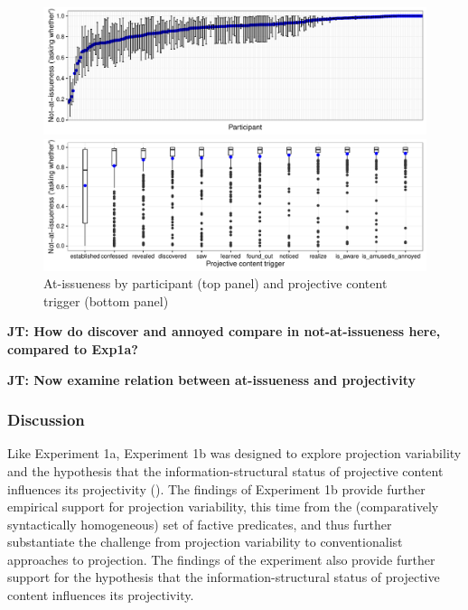 \documentclass[11pt,fleqn]{article}
\newcommand{\6}{\mbox{$[\hspace*{-.6mm}[$}}
\newcommand{\9}{\mbox{$]\hspace*{-.6mm}]$}}
\newcommand{\jt}[1]{\textbf{\color{blue}JT: #1}}
\begin{document}
\begin{figure}[!h]
\begin{center}

\includegraphics[width=16cm]{../results/exp1b/graphs/ai-subjectmeans}

\includegraphics[width=16cm]{../results/exp1b/graphs/boxplot-not-at-issueness}

\end{center}
\caption{At-issueness by participant (top panel) and projective content trigger (bottom panel)}
\label{f-ai-1b}
\end{figure}

\jt{How do discover and annoyed compare in not-at-issueness here, compared to Exp1a?}

\jt{Now examine relation between at-issueness and projectivity}

\subsubsection{Discussion}

Like Experiment 1a, Experiment 1b was designed to explore projection variability and the hypothesis that the information-structural status of projective content influences its projectivity (\citealt{brst-salt10,brst-ar}). The findings of Experiment 1b provide further empirical support for projection variability, this time from the (comparatively syntactically homogeneous) set of factive predicates, and thus further substantiate the challenge from projection variability to conventionalist approaches to projection. The findings of the experiment also provide further support for the hypothesis that the information-structural status of projective content influences its projectivity.
\end{document}
